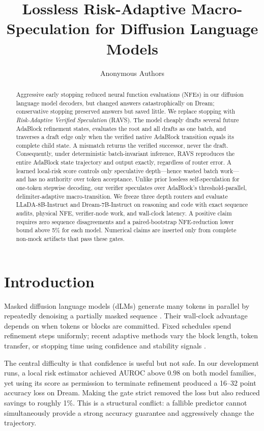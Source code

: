 \documentclass{article}
\title{Lossless Risk-Adaptive Macro-Speculation for Diffusion Language Models}
\author{Anonymous Authors}
\date{}
\newcommand{\method}{\textsc{RAVS}\xspace}
\begin{document}
\maketitle

\begin{abstract}
Aggressive early stopping reduced neural function evaluations (NFEs) in our diffusion language
model decoders, but changed answers catastrophically on Dream; conservative stopping preserved
answers but saved little. We replace stopping with \emph{Risk-Adaptive Verified Speculation}
(\method). The model cheaply drafts several future AdaBlock refinement states, evaluates the root
and all drafts as one batch, and traverses a draft edge only when the verified native AdaBlock
transition equals its complete child state. A mismatch returns the verified successor, never the
draft. Consequently, under deterministic batch-invariant inference, \method reproduces the entire
AdaBlock state trajectory and output exactly, regardless of router error. A learned local-risk
score controls only speculative depth---hence wasted batch work---and has no authority over token
acceptance. Unlike prior lossless self-speculation for one-token stepwise decoding, our verifier
speculates over AdaBlock's threshold-parallel, delimiter-adaptive macro-transition. We freeze three
depth routers and evaluate LLaDA-8B-Instruct and Dream-7B-Instruct on reasoning and code with exact
sequence audits, physical NFE, verifier-node work, and wall-clock latency. A positive claim requires
zero sequence disagreements and a paired-bootstrap NFE-reduction lower bound above 5\% for each
model. Numerical claims are inserted only from complete non-mock artifacts that pass these gates.
\end{abstract}

\section{Introduction}

Masked diffusion language models (dLMs) generate many tokens in parallel by repeatedly
denoising a partially masked sequence \citep{nie2025llada,ye2025dream}. Their wall-clock
advantage depends on when tokens or blocks are committed. Fixed schedules spend refinement
steps uniformly; recent adaptive methods vary the block length, token transfer, or stopping
time using confidence and stability signals
\citep{lu2026adablock,wu2025fastdllm,israel2025apd,mohamed2025sched}.

The central difficulty is that confidence is useful but not safe. In our development runs, a local
risk estimator achieved AUROC above $0.98$ on both model families, yet using its score as permission
to terminate refinement produced a 16--32 point accuracy loss on Dream. Making the gate strict
removed the loss but also reduced savings to roughly 1\%. This is a structural conflict: a fallible
predictor cannot simultaneously provide a strong accuracy guarantee and aggressively change the
trajectory.
\end{document}
